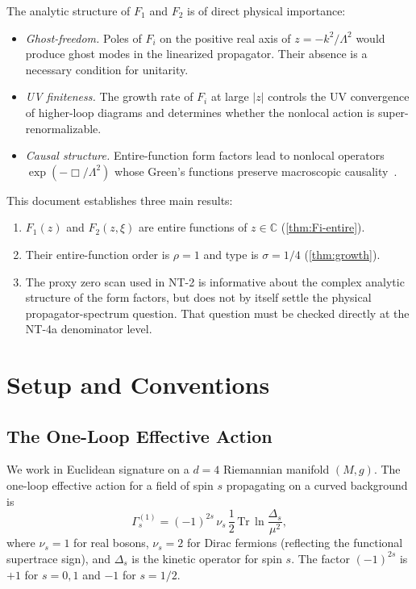 \documentclass[11pt,a4paper]{article}
\theoremstyle{plain}
\theoremstyle{definition}
\begin{document}
The analytic structure of $F_1$ and $F_2$ is of direct physical importance:
\begin{itemize}[nosep]
  \item \emph{Ghost-freedom.} Poles of $F_i$ on the positive real axis of
    $z = -k^2/\Lambda^2$ would produce ghost modes in the linearized
    propagator. Their absence is a necessary condition for unitarity.
  \item \emph{UV finiteness.} The growth rate of $F_i$ at large $|z|$
    controls the UV convergence of higher-loop diagrams and determines
    whether the nonlocal action is super-renormalizable.
  \item \emph{Causal structure.} Entire-function form factors lead to
    nonlocal operators $\exp(-\Box/\Lambda^2)$ whose Green's functions
    preserve macroscopic causality~\cite{Tom97,BMS06}.
\end{itemize}

This document establishes three main results:
\begin{enumerate}[nosep]
  \item $F_1(z)$ and $F_2(z,\xi)$ are entire functions of $z \in \mathbb{C}$
    (\cref{thm:Fi-entire}).
  \item Their entire-function order is $\rho = 1$ and type is $\sigma = 1/4$
    (\cref{thm:growth}).
  \item The proxy zero scan used in NT-2 is informative about the complex
    analytic structure of the form factors, but does not by itself settle
    the physical propagator-spectrum question. That question must be checked
    directly at the NT-4a denominator level.
\end{enumerate}

\section{Setup and Conventions}\label{sec:setup}

\subsection{The One-Loop Effective Action}

We work in Euclidean signature on a $d=4$ Riemannian manifold $(M,g)$.
The one-loop effective action for a field of spin $s$ propagating on a
curved background is
\begin{equation}\label{eq:Gamma-s}
  \Gamma^{(1)}_s = (-1)^{2s}\, \nu_s\,
  \frac{1}{2}\, \mathrm{Tr}\, \ln \frac{\Delta_s}{\mu^2},
\end{equation}
where $\nu_s = 1$ for real bosons, $\nu_s = 2$ for Dirac fermions
(reflecting the functional supertrace sign), and $\Delta_s$ is the
kinetic operator for spin $s$. The factor $(-1)^{2s}$ is $+1$ for
$s = 0, 1$ and $-1$ for $s = 1/2$.
\end{document}
